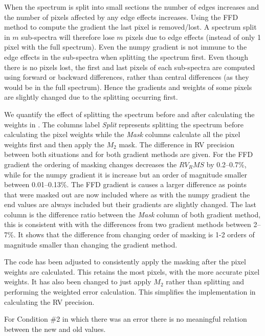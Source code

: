 When the spectrum is split into small sections the number of edges increases and the number of pixels affected by any edge effects increases. Using the FFD method to compute the gradient the last pixel is removed/lost. A spectrum split in \(m\) sub-spectra will therefore lose \(m\) pixels due to edge effects (instead of only 1 pixel with the full spectrum).
Even the numpy gradient is not immune to the edge effects in the sub-spectra when splitting the spectrum first. Even though there is no pixels lost, the first and last pixels of each sub-spectra are computed using forward or backward differences, rather than central differences (as they would be in the full spectrum). Hence the gradients and weights of some pixels are slightly changed due to the splitting occurring first.

We quantify the effect of splitting the spectrum before and after calculating the weights in . The columns label \emph{Split} represents splitting the spectrum before calculating the pixel weights while the \emph{Mask} columns calculate all the pixel weights first and then apply the \(M_2\) mask. The difference in RV precision between both situations and for both gradient methods are given.
For the FFD gradient the ordering of masking changes decreases the {\red{}\(RV_RMS\)} by 0.2--0.7\%, while for the numpy gradient it is increase but an order of magnitude smaller between 0.01--0.13\%.
The FFD gradient is causes a larger difference as points that were masked out are now included where as with the numpy gradient the end values are always included but their gradients are slightly changed.
The last column is the difference ratio between the \emph{Mask} column of both gradient method, this is consistent with  with the differences from two gradient methods between 2--7\%.
It shows that the difference from changing order of masking is 1-2 orders of magnitude smaller than changing the gradient method.

The code has been adjusted to consistently apply the masking after the pixel weights are calculated. This retains the most pixels, with the more accurate pixel weights. It has also been changed to just apply \(M_2\) rather than splitting and performing the weighted error calculation. This simplifies the implementation in calculating the RV precision.



{\red{} For Condition \#2 in which there was an error there is no meaningful relation between the new and old values. }



